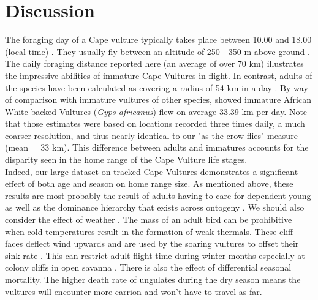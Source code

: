 \section{\uppercase{D}iscussion}
The foraging day of a Cape vulture typically takes place between 10.00 and 18.00 (local time) \citep{mendelsohn2005observations}. They usually fly between an altitude of 250 - 350 m above ground \citep{mundy1992vultures}. The daily foraging distance reported here (an average of over 70 km) illustrates the impressive abilities of immature Cape Vultures in flight. In contrast, adults of the species have been calculated as covering a radius of 54 km in a day \citep{mundy1992vultures}. By way of comparison with immature vultures of other species, \cite{phipps2013foraging} showed immature African White-backed Vultures (\textit{Gyps africanus}) flew on average 33.39 km per day. Note that those estimates were based on locations recorded three times daily, a much coarser resolution, and thus nearly identical to our "as the crow flies" measure (mean = 33 km). This difference between adults and immatures accounts for the disparity seen in the home range of the Cape Vulture life stages. \\
 \indent
	Indeed, our large dataset on tracked Cape Vultures demonstrates a significant effect of both age and season on home range size. As mentioned above, these results are most probably the result of adults having to care for dependent young as well as the dominance hierarchy that exists across ontogeny \citep{duriez2012intra,mundy1992vultures}. We should also consider the effect of weather \citep{shepard2013daily}. The mass of an adult bird can be prohibitive when cold temperatures result in the formation of weak thermals. These cliff faces deflect wind upwards and are used by the soaring vultures to offset their sink rate \citep{shepard2013energy}. This can restrict adult flight time during winter months especially at colony cliffs in open savanna \citep{mundy1992vultures}. There is also the effect of differential seasonal mortality. The higher death rate of ungulates during the dry season means the vultures will encounter more carrion and won't have to travel as far. 

